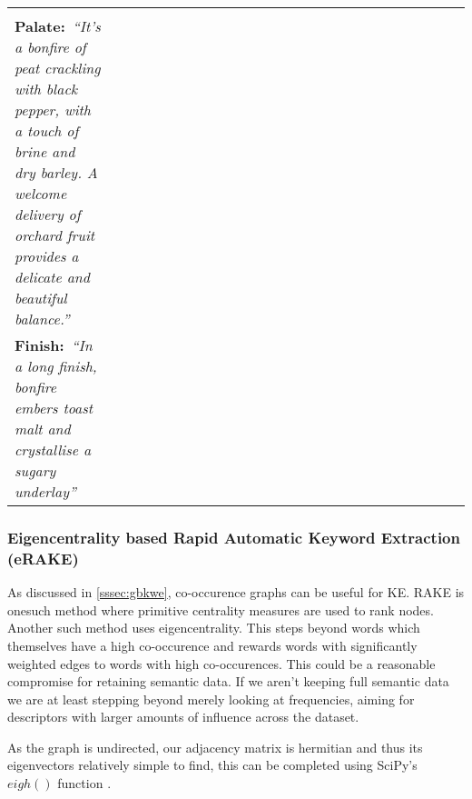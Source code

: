 \begin{table}
\begin{tabular}{p{0.2\linewidth} p{0.8\linewidth}}
\begin{minipage}[t]{0.8\columnwidth}
{            }\\
            \textbf{Palate:}\textit{~``It's a bonfire of peat crackling with black pepper, with a touch of brine 
            and dry barley. A welcome delivery of orchard fruit provides a delicate and beautiful balance.''
            }\\
            \textbf{Finish:}~\textit{``In a long finish, bonfire embers toast malt and crystallise a sugary underlay''
            }\end{minipage}                                                                                                                                                                                                                                                    \\
        \toprule
    \end{tabular}
\end{table}

\subsubsection{Eigencentrality based Rapid Automatic Keyword Extraction (eRAKE)}\label{ssec:erake}
As discussed in \autoref{sssec:gbkwe}, co-occurence graphs can be useful for KE.  RAKE is onesuch method where primitive
centrality measures are used to rank nodes.  Another such method uses eigencentrality.  This steps beyond words which
themselves have a high co-occurence and rewards words with significantly weighted edges to words with high co-occurences.
This could be a reasonable compromise for retaining semantic data.  If we aren't keeping full semantic data we are
at least stepping beyond merely looking at frequencies, aiming for descriptors with larger amounts of influence across
the dataset.

As the graph is undirected, our adjacency matrix is hermitian and thus its eigenvectors relatively simple to find,
this can be completed using SciPy's $eigh()$ function \cite{hubbard_2020, 2020NumPy}.